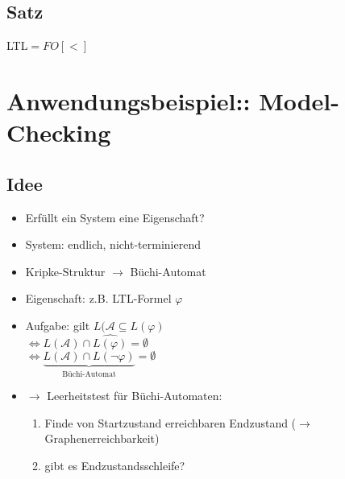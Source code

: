     \subsection{Satz}
        LTL$=FO[<]$\pagebreak
\section{Anwendungsbeispiel:: Model-Checking}
    \subsection{Idee}
        \begin{itemize}
            \item Erfüllt ein System eine Eigenschaft?
            \item System: endlich, nicht-terminierend
            \item Kripke-Struktur $\rightarrow$ Büchi-Automat
            \item Eigenschaft: z.B. LTL-Formel $\varphi$
            \item Aufgabe: gilt $L(\mathcal{A}\subseteq L(\varphi)$\\
            $\Leftrightarrow L(\mathcal{A})\cap\hat{L(\varphi)}=\emptyset$\\
            $\Leftrightarrow \underbrace{L(\mathcal{A})\cap L(\neg\varphi)}_{\text{Büchi-Automat}}=\emptyset$
            \item $\rightarrow$ Leerheitstest für Büchi-Automaten:
            \begin{enumerate}
                \item Finde von Startzustand erreichbaren Endzustand ($\rightarrow$ Graphenerreichbarkeit)
                \item gibt es Endzustandsschleife?
            \end{enumerate}
        \end{itemize}
